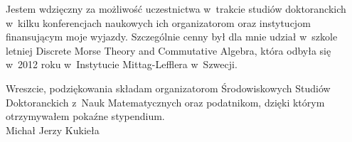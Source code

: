Jestem wdzięczny za możliwość uczestnictwa w~trakcie studiów doktoranckich w~kilku konferencjach naukowych ich organizatorom oraz instytucjom finansującym moje wyjazdy. Szczególnie cenny był dla mnie udział w~szkole letniej Discrete Morse Theory and Commutative Algebra, która odbyła się w~2012 roku w~Instytucie \mbox{Mittag-Lefflera} w~Szwecji.

Wreszcie, podziękowania składam organizatorom Środowiskowych Studiów Doktoranckich z~Nauk Matematycznych oraz podatnikom, dzięki którym otrzymywałem pokaźne stypendium.\\

\hfill Michał Jerzy Kukieła
